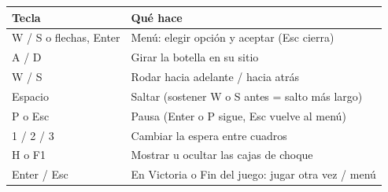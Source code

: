 \documentclass[12pt, a4paper]{article}
\begin{document}
{
\begin{center}
\begin{tabular}{|l|l|}
\hline
\textbf{Tecla} & \textbf{Qué hace}\\ \hline
W / S o flechas, Enter & Menú: elegir opción y aceptar (Esc cierra)\\ \hline
A / D & Girar la botella en su sitio\\ \hline
W / S & Rodar hacia adelante / hacia atrás\\ \hline
Espacio & Saltar (sostener W o S antes = salto más largo)\\ \hline
P o Esc & Pausa (Enter o P sigue, Esc vuelve al menú)\\ \hline
1 / 2 / 3 & Cambiar la espera entre cuadros\\ \hline
H o F1 & Mostrar u ocultar las cajas de choque\\ \hline
Enter / Esc & En Victoria o Fin del juego: jugar otra vez / menú\\ \hline
\end{tabular}
\end{center}
\par}
\end{document}
